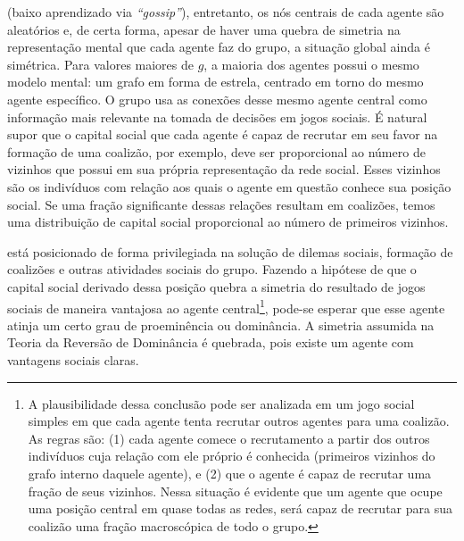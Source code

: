  (baixo aprendizado via \emph{``gossip''}), entretanto,  os nós centrais de cada agente são aleatórios e, de certa forma, apesar de haver uma quebra de simetria na representação mental que cada agente faz do grupo, a situação global ainda é simétrica. Para valores maiores de $g$, a maioria dos agentes possui o mesmo modelo mental: um grafo em forma de estrela, centrado em torno do mesmo agente específico. O grupo usa as conexões desse mesmo agente central como informação mais relevante na tomada de decisões em jogos sociais. É natural supor que o capital social que cada agente é capaz de recrutar em seu favor na formação de uma coalizão, por exemplo, deve ser proporcional ao número de vizinhos que possui em sua própria representação da rede social. Esses vizinhos são os indivíduos com relação aos quais o agente em questão conhece sua posição social. Se uma fração significante dessas relações resultam em coalizões, temos uma distribuição de capital social proporcional ao número de primeiros vizinhos.

 está posicionado de forma privilegiada na solução de dilemas sociais, formação de coalizões e outras atividades sociais do grupo. Fazendo a hipótese de que o capital social derivado dessa posição quebra a simetria do resultado de jogos sociais de maneira vantajosa ao agente central\footnote[][-2cm]{A plausibilidade dessa conclusão pode ser analizada em um jogo social simples em que cada agente tenta recrutar outros agentes para uma coalizão. As regras são: (1) cada agente comece o recrutamento a partir dos outros indivíduos cuja relação com ele próprio é conhecida (primeiros vizinhos do grafo interno daquele agente), e (2) que o agente é capaz de recrutar uma fração de seus vizinhos. Nessa situação é evidente que um agente que ocupe uma posição central em quase todas as redes, será capaz de recrutar para sua coalizão uma fração macroscópica de todo 	o grupo.}, pode-se esperar que esse agente atinja um certo grau de proeminência ou dominância. A simetria assumida na Teoria da Reversão de Dominância é quebrada, pois existe um agente com vantagens sociais claras.

